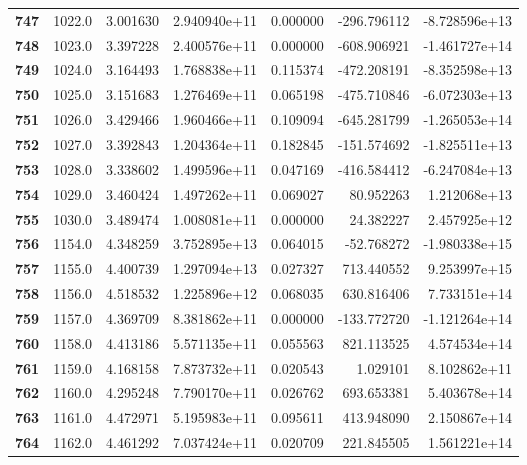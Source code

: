 \documentclass{report}[12pt]
\begin{document}
\begin{center}
\begin{tabular}{lrrrrrr}
\textbf{747 } &         1022.0 &   3.001630 &  2.940940e+11 &    0.000000 &  -296.796112 & -8.728596e+13 \\
\textbf{748 } &         1023.0 &   3.397228 &  2.400576e+11 &    0.000000 &  -608.906921 & -1.461727e+14 \\
\textbf{749 } &         1024.0 &   3.164493 &  1.768838e+11 &    0.115374 &  -472.208191 & -8.352598e+13 \\
\textbf{750 } &         1025.0 &   3.151683 &  1.276469e+11 &    0.065198 &  -475.710846 & -6.072303e+13 \\
\textbf{751 } &         1026.0 &   3.429466 &  1.960466e+11 &    0.109094 &  -645.281799 & -1.265053e+14 \\
\textbf{752 } &         1027.0 &   3.392843 &  1.204364e+11 &    0.182845 &  -151.574692 & -1.825511e+13 \\
\textbf{753 } &         1028.0 &   3.338602 &  1.499596e+11 &    0.047169 &  -416.584412 & -6.247084e+13 \\
\textbf{754 } &         1029.0 &   3.460424 &  1.497262e+11 &    0.069027 &    80.952263 &  1.212068e+13 \\
\textbf{755 } &         1030.0 &   3.489474 &  1.008081e+11 &    0.000000 &    24.382227 &  2.457925e+12 \\
\textbf{756 } &         1154.0 &   4.348259 &  3.752895e+13 &    0.064015 &   -52.768272 & -1.980338e+15 \\
\textbf{757 } &         1155.0 &   4.400739 &  1.297094e+13 &    0.027327 &   713.440552 &  9.253997e+15 \\
\textbf{758 } &         1156.0 &   4.518532 &  1.225896e+12 &    0.068035 &   630.816406 &  7.733151e+14 \\
\textbf{759 } &         1157.0 &   4.369709 &  8.381862e+11 &    0.000000 &  -133.772720 & -1.121264e+14 \\
\textbf{760 } &         1158.0 &   4.413186 &  5.571135e+11 &    0.055563 &   821.113525 &  4.574534e+14 \\
\textbf{761 } &         1159.0 &   4.168158 &  7.873732e+11 &    0.020543 &     1.029101 &  8.102862e+11 \\
\textbf{762 } &         1160.0 &   4.295248 &  7.790170e+11 &    0.026762 &   693.653381 &  5.403678e+14 \\
\textbf{763 } &         1161.0 &   4.472971 &  5.195983e+11 &    0.095611 &   413.948090 &  2.150867e+14 \\
\textbf{764 } &         1162.0 &   4.461292 &  7.037424e+11 &    0.020709 &   221.845505 &  1.561221e+14 \\

\end{tabular}
\end{center}
\end{document}
